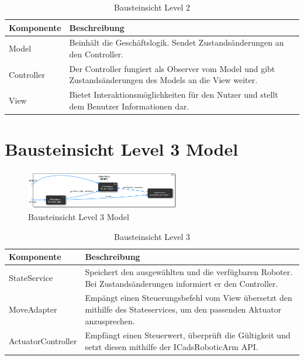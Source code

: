 \begin{table}[h!]
\centering
\begin{tabular}{|p{4cm}|p{9cm}|}
\hline
\textbf{Komponente} & \textbf{Beschreibung} \\ \hline
Model & Beinhält die Geschäftslogik. Sendet Zustandsänderungen an den Controller. \\ \hline
Controller & Der Controller fungiert als Observer vom Model und gibt Zustandsänderungen des Models an die View weiter. \\ \hline
View & Bietet Interaktionsmöglichkeiten für den Nutzer und stellt dem Benutzer Informationen dar. 
\end{tabular}
\caption{Bausteinsicht Level 2}
\label{tab:lvl2}
\end{table}
\newpage

\section{Bausteinsicht Level 3 Model}
\begin{figure}[h] %
    \centering
    \includegraphics[width=0.6\textwidth]{diagrams/baustein_lvl_3_model.png}
    \caption{Bausteinsicht Level 3 Model}
\end{figure}

\begin{table}[h!]
\centering
\begin{tabular}{|p{4cm}|p{9cm}|}
\hline
\textbf{Komponente} & \textbf{Beschreibung} \\ \hline
StateService & Speichert den  ausgewählten und die verfügbaren Roboter. Bei Zustandsänderungen informiert er den Controller. \\ \hline
MoveAdapter  & Empängt einen Steuerungsbefehl vom View übersetzt den mithilfe des Stateservices, um den passenden Aktuator anzusprechen. \\ \hline
ActuatorController & Empfängt einen Steuerwert, überprüft die Gültigkeit und setzt diesen mithilfe der ICadsRoboticArm API. \\ \hline
\end{tabular}
\caption{Bausteinsicht Level 3}
\label{tab:lvl3}
\end{table}

